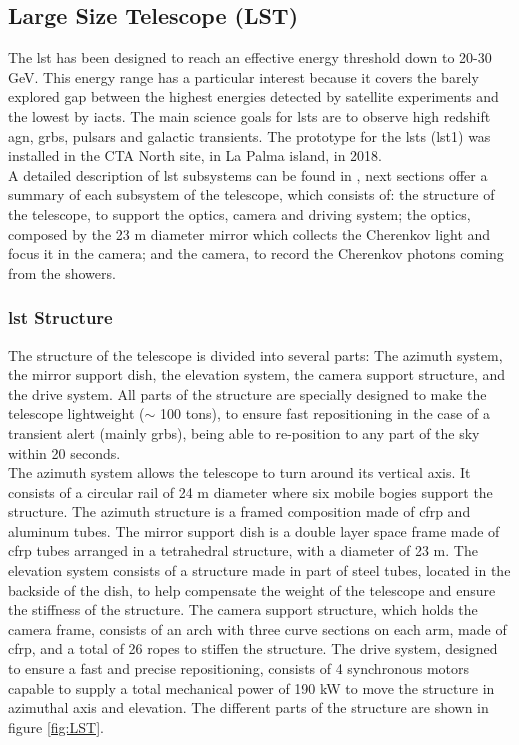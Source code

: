 \documentclass[main.tex]{subfiles}
\begin{document}
\subsection{Large Size Telescope (LST)}

The \gls{lst} has been designed to reach an effective energy threshold down to 20-30 GeV. This energy range has a particular interest because it covers the barely explored gap between the highest energies detected by satellite experiments and the lowest by \glspl{iact}. The main science goals for \glspl{lst} are to observe high redshift \gls{agn}, \glspl{grb}, pulsars and galactic transients. The prototype for the \glspl{lst} (\gls{lst}1) was installed in the CTA North site, in La Palma island, in 2018.\\
A detailed description of \gls{lst} subsystems can be found in \cite{2013LST}, next sections offer a summary of each subsystem of the telescope, which consists of: the structure of the telescope, to support the optics, camera and driving system; the optics, composed by the 23 m diameter mirror which collects the Cherenkov light and focus it in the camera; and the camera, to record the Cherenkov photons coming from the showers.

\subsubsection{\gls{lst} Structure}

The structure of the telescope is divided into several parts: The azimuth system, the mirror support dish, the elevation system, the camera support structure, and the drive system. All parts of the structure are specially designed to make the telescope lightweight ($\sim$ 100 tons), to ensure fast repositioning in the case of a transient alert (mainly \glspl{grb}), being able to re-position to any part of the sky within 20 seconds.\\
The azimuth system allows the telescope to turn around its vertical axis. It consists of a circular rail of 24 m diameter where six mobile bogies support the structure. The azimuth structure is a framed composition made of \gls{cfrp} and aluminum tubes. The mirror support dish is a double layer space frame made of \gls{cfrp} tubes arranged in a tetrahedral structure, with a diameter of 23 m. The elevation system consists of a structure made in part of steel tubes, located in the backside of the dish, to help compensate the weight of the telescope and ensure the stiffness of the structure. The camera support structure, which holds the camera frame, consists of an arch with three curve sections on each arm, made of \gls{cfrp}, and a total of 26 ropes to stiffen the structure. The drive system, designed to ensure a fast and precise repositioning, consists of 4 synchronous motors capable to supply a total mechanical power of 190 kW to move the structure in azimuthal axis and elevation. The different parts of the structure are shown in figure \ref{fig:LST}.
\end{document}
